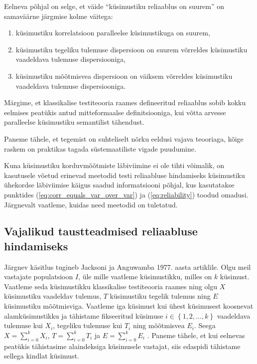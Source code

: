 \documentclass[a4paper,12pt,oneside]{article}
\numberwithin{equation}{section}
\theoremstyle{definition}
\begin{document}
Eelneva põhjal on selge, et väide  "`küsimustiku  reliaablus on suurem"' on samaväärne järgmise kolme väitega:
\begin{enumerate}
\item küsimustiku korrelatsioon paralleelse küsimustikuga on suurem,
\item küsimustiku tegeliku tulemuse dispersioon on suurem võrreldes küsimustiku vaadeldava tulemuse dispersiooniga,
\item küsimustiku mõõtmisvea dispersioon on väiksem võrreldes küsimustiku vaadeldava tulemuse dispersiooniga.
\end{enumerate}

Märgime, et klassikalise testiteooria raames defineeritud reliaablus sobib  kokku eelmises peatükis antud mitteformaalse definitsiooniga, kui võtta arvesse paralleelse küsimustiku semantilist tähendust. 

Paneme tähele, et tegemist on suhteliselt nõrku eeldusi vajava teooriaga, kõige raskem on praktikas tagada süstemaatiliste vigade puudumine.



Kuna küsimustiku korduvmõõtmiste läbiviimine ei ole tihti võimalik, on kasutusele võetud erinevad meetodid testi reliaabluse hindamiseks küsimustiku ühekordse läbiviimise käigus saadud informatsiooni põhjal, kus kasutatakse punktides (\ref{eq:corr_equals_var_over_var}) ja (\ref{eq:reliability}) toodud omadusi. Järgnevalt vaatleme, kuidas need meetodid on tuletatud.



\subsection{Vajalikud taustteadmised reliaabluse hindamiseks}

Järgnev käsitlus tugineb Jacksoni ja Anguwamba 1977. aasta artiklile.\cite{Jackson1977}
Olgu meil vastajate populatsioon $I$, üle mille vaatleme küsimustikku, milles on $k$ k\"usimust. Vaatleme seda küsimustikku klassikalise testiteooria raames ning olgu $X$ küsimustiku vaadeldav tulemus, $T$ küsimustiku tegelik tulemus ning $E$ küsimustiku mõõtmisviga. Vaatleme iga küsimust kui ühest küsimusest koosnevat alamküsimustikku ja tähistame fikseeritud k\"usimuse $ i \in \left\lbrace 1,2,\ldots,k \right\rbrace$ vaadeldava tulemuse kui $X_i$, tegeliku tulemuse kui $T_i$ ning mõõtmisvea $E_i$. Seega $X = \sum \limits_{i=0}^{k} X_i$, $T = \sum \limits_{i=0}^{k} T_i$ ja $E = \sum \limits_{i=0}^{k} E_i$ . Paneme tähele, et kui eelnevas peatükis tähistasime alaindeksiga küsimusele vastajat, siis edaspidi tähistame sellega kindlat küsimust. 
\end{document}
